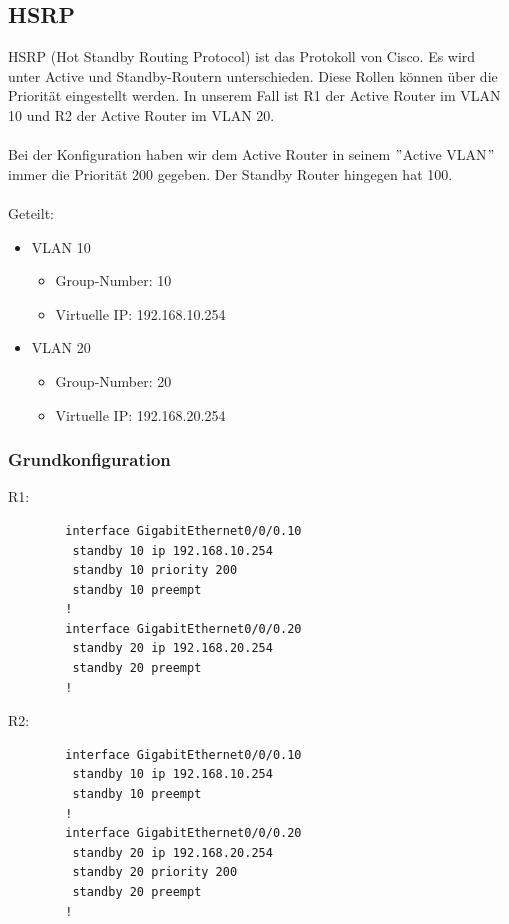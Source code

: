 \documentclass[a4paper, ngerman]{article}
\begin{document}
\subsection{HSRP}
HSRP (Hot Standby Routing Protocol) ist das Protokoll von Cisco. Es wird unter Active und Standby-Routern unterschieden.
Diese Rollen können über die Priorität eingestellt werden. In unserem Fall ist R1 der Active Router im VLAN 10 und R2 der Active Router im VLAN 20.
\\ \\
Bei der Konfiguration haben wir dem Active Router in seinem $"$Active VLAN$"$ immer die Priorität 200 gegeben. Der Standby Router hingegen hat 100.
\\ \\
Geteilt:
\begin{itemize}
    \item VLAN 10
          \begin{itemize}
              \item Group-Number: 10
              \item Virtuelle IP: 192.168.10.254
          \end{itemize}
    \item VLAN 20
          \begin{itemize}
              \item Group-Number: 20
              \item Virtuelle IP: 192.168.20.254
          \end{itemize}
\end{itemize}
\subsubsection{Grundkonfiguration}
R1:
\begin{framed}
    \begin{verbatim}
        interface GigabitEthernet0/0/0.10
         standby 10 ip 192.168.10.254
         standby 10 priority 200
         standby 10 preempt
        !
        interface GigabitEthernet0/0/0.20
         standby 20 ip 192.168.20.254
         standby 20 preempt
        !    
    \end{verbatim}
\end{framed}

R2:
\begin{framed}
    \begin{verbatim}
        interface GigabitEthernet0/0/0.10
         standby 10 ip 192.168.10.254
         standby 10 preempt
        ! 
        interface GigabitEthernet0/0/0.20
         standby 20 ip 192.168.20.254
         standby 20 priority 200
         standby 20 preempt
        !
    \end{verbatim}
\end{framed}
\end{document}
